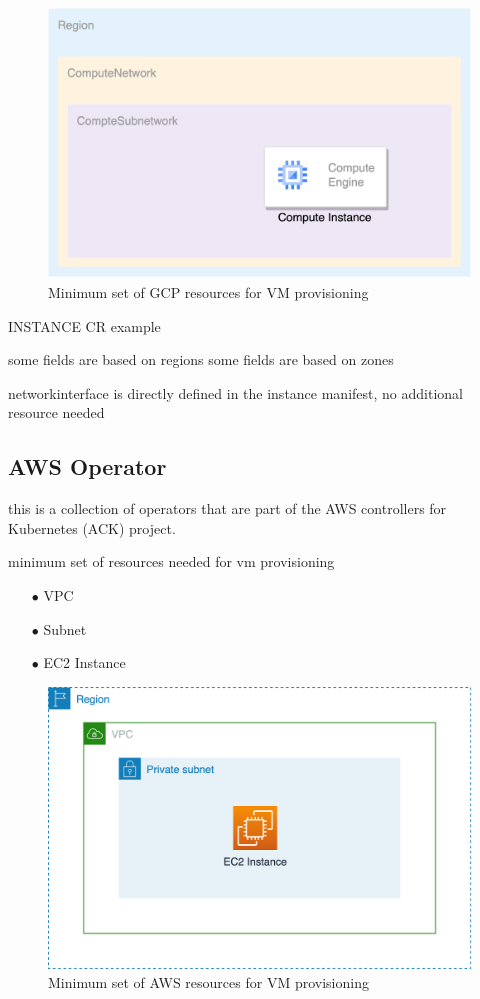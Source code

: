 \begin{figure}[H]
\centering
\includegraphics[width=0.75\linewidth]{images/gcp.png}
\caption{Minimum set of GCP resources for VM provisioning}
\label{fig:gcp}
\end{figure}




INSTANCE CR example

some fields are based on regions
some fields are based on zones


networkinterface is directly defined in the instance manifest,
no additional resource needed



\subsection{AWS Operator}

this is a collection of operators that are part of the AWS controllers for Kubernetes (ACK) project.

minimum set of resources needed for vm provisioning

\begin{itemize}[itemsep=0.2pt, topsep=1pt] 
\item[$\bullet$] VPC
\item[$\bullet$] Subnet
\item[$\bullet$] EC2 Instance
\end{itemize}






\begin{figure}[H]
\centering
\includegraphics[width=0.75\linewidth]{images/aws.png}
\caption{Minimum set of AWS resources for VM provisioning}
\label{fig:aws}
\end{figure}


